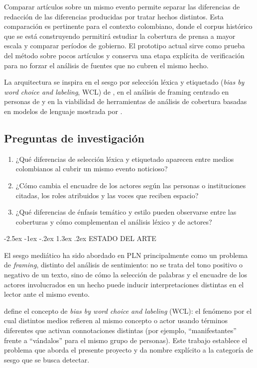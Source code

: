 \documentclass[10pt,twocolumn]{article}
\makeatletter
\renewcommand{\section}{\@startsection{section}{1}{\z@}%
  {-2.5ex \@plus -1ex \@minus -.2ex}%
  {1.3ex \@plus .2ex}%
  {\normalfont\large\bfseries\centering}}
\makeatother
\begin{document}
Comparar artículos sobre un mismo evento permite separar las diferencias de
redacción de las diferencias producidas por tratar hechos distintos. Esta
comparación es pertinente para el contexto colombiano, donde el corpus
histórico que se está construyendo permitirá estudiar la cobertura de prensa a
mayor escala y comparar períodos de gobierno. El prototipo actual sirve como
prueba del método sobre pocos artículos y conserva una etapa explícita de
verificación para no forzar el análisis de fuentes que no cubren el mismo hecho.

La arquitectura se inspira en el sesgo por selección léxica y etiquetado
(\emph{bias by word choice and labeling}, WCL) de \cite{hamborg2020}, en el
análisis de framing centrado en personas de \cite{hamborg2023} y en la
viabilidad de herramientas de análisis de cobertura basadas en modelos de
lenguaje mostrada por \cite{mediabiasdetector2025}.

\subsection{Preguntas de investigación}

\begin{enumerate}
  \item ¿Qué diferencias de selección léxica y etiquetado aparecen entre
  medios colombianos al cubrir un mismo evento noticioso?
  \item ¿Cómo cambia el encuadre de los actores según las personas o
  instituciones citadas, los roles atribuidos y las voces que reciben espacio?
  \item ¿Qué diferencias de énfasis temático y estilo pueden observarse entre
  las coberturas y cómo complementan el análisis léxico y de actores?
\end{enumerate}

\section{ESTADO DEL ARTE}

El sesgo mediático ha sido abordado en PLN principalmente como un problema
de \emph{framing}, distinto del análisis de sentimiento: no se trata del
tono positivo o negativo de un texto, sino de cómo la selección de
palabras y el encuadre de los actores involucrados en un hecho puede
inducir interpretaciones distintas en el lector ante el mismo evento.

\cite{hamborg2020} define el concepto de \emph{bias by word choice and
labeling} (WCL): el fenómeno por el cual distintos medios refieren al
mismo concepto o actor usando términos diferentes que activan
connotaciones distintas (por ejemplo, ``manifestantes'' frente a
``vándalos'' para el mismo grupo de personas). Este trabajo establece el
problema que aborda el presente proyecto y da nombre explícito a la
categoría de sesgo que se busca detectar.
\end{document}
